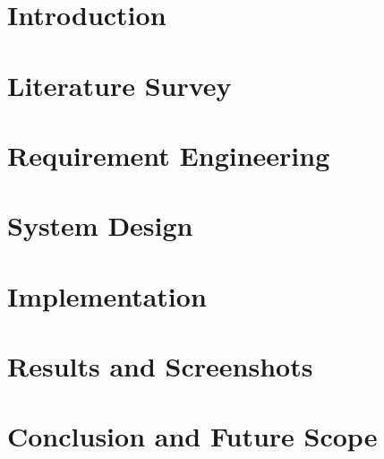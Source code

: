 \documentclass[a4paper,12pt,oneside]{report}
\begin{document}
\tableofcontents
\listoffigures
\listoftables
\newpage

\chapter{Introduction}


\chapter{Literature Survey}


\chapter{Requirement Engineering}


\chapter{System Design}


\chapter{Implementation}


\chapter{Results and Screenshots}


\chapter{Conclusion and Future Scope}


\nocite{*}


\end{document}
